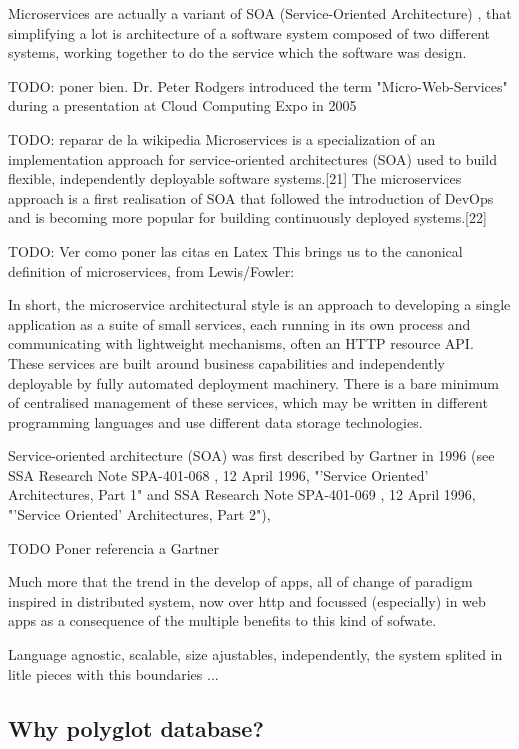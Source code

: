 Microservices are actually a variant of SOA (Service-Oriented Architecture) ,
that simplifying a lot is architecture of a software system composed of two
different systems, working together to do the service which the software was design.

TODO: poner bien.
Dr. Peter Rodgers introduced the term "Micro-Web-Services" during a presentation at Cloud Computing Expo in 2005

TODO: reparar de la wikipedia
Microservices is a specialization of an implementation approach for service-oriented architectures (SOA) used to build flexible, independently deployable software systems.[21] The microservices approach is a first realisation of SOA that followed the introduction of DevOps and is becoming more popular for building continuously deployed systems.[22]

TODO: Ver como poner las citas en Latex
This brings us to the canonical definition of microservices, from Lewis/Fowler:

In short, the microservice architectural style is an approach to developing a
single application as a suite of small services, each running in its own process
and communicating with lightweight mechanisms, often an HTTP resource API.
These services are built around business capabilities and independently deployable
by fully automated deployment machinery. There is a bare minimum of centralised management
of these services, which may be written in different programming languages and
use different data storage technologies.

Service-oriented architecture (SOA) was first described by Gartner in 1996
(see SSA Research Note SPA-401-068 , 12 April 1996, "'Service Oriented'
Architectures, Part 1" and SSA Research Note SPA-401-069 , 12 April 1996,
"'Service Oriented' Architectures, Part 2"),

TODO Poner referencia a Gartner


Much more that the trend in the develop of apps, all of change of
paradigm inspired in distributed system, now over http and focussed
(especially) in web apps as a consequence of the multiple benefits
to this kind of sofwate. \bigskip

Language agnostic, scalable, size ajustables, independently, the system
splited in litle pieces with this boundaries ...

\subsection{Why polyglot database?}

